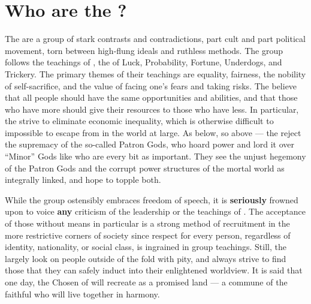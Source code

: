 \documentclass[blue]{GL2020}
\begin{document}
\name{\bCult{}}

\section*{Who are the \pGoaties{}?}
The \pGoaties{} are a group of stark contrasts and contradictions, part cult and part political movement, torn between high-flung ideals and ruthless methods. The group follows the teachings of \cGenesis{}, the \cGenesis{\Deity} of Luck, Probability, Fortune, Underdogs, and Trickery. The primary themes of their teachings are equality, fairness, the nobility of self-sacrifice, and the value of facing one's fears and taking risks. The \pGoaties{} believe that all people should have the same opportunities and abilities, and that those who have more should give their resources to those who have less. In particular, the \pGoaties{} strive to eliminate economic inequality, which is otherwise difficult to impossible to escape from in the world at large. As below, so above — the \pGoaties{} reject the supremacy of the so-called Patron Gods, who hoard power and lord it over “Minor” Gods like \cGenesis{} who are every bit as important. They see the unjust hegemony of the Patron Gods and the corrupt power structures of the mortal world as integrally linked, and hope to topple both.

While the group ostensibly embraces freedom of speech, it is \textbf{seriously} frowned upon to voice \textbf{any} criticism of the leadership or the teachings of \cGenesis{}. The acceptance of those without means in particular is a strong method of recruitment in the more restrictive corners of society since respect for every person, regardless of identity, nationality, or social class, is ingrained in group teachings. Still, the \pGoaties{} largely look on people outside of the fold with pity, and always strive to find those that they can safely induct into their enlightened worldview. It is said that one day, the Chosen of \cGenesis{} will recreate \pEarth{} as a promised land — a commune of the faithful who will live together in harmony.
\end{document}
